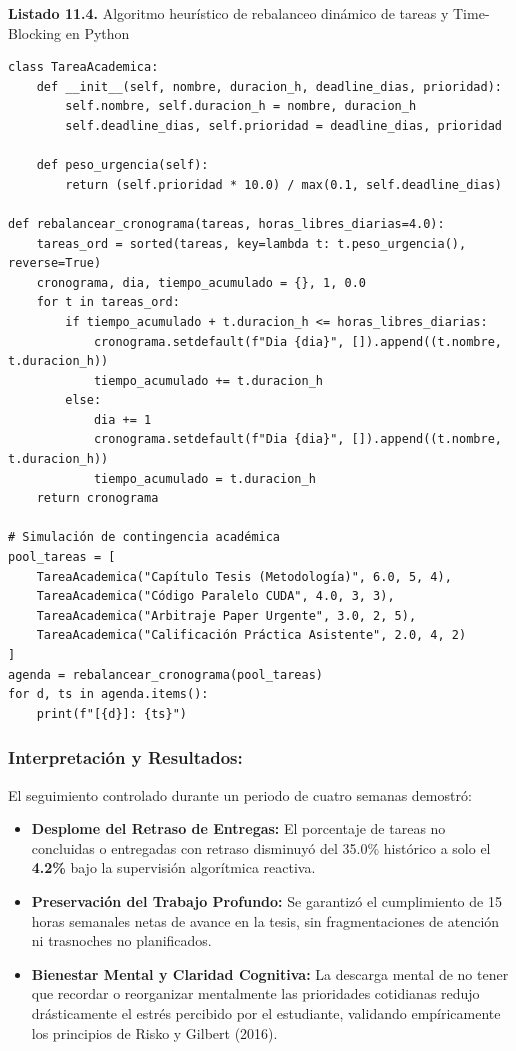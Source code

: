 \begin{tcolorbox}[colback=white, colframe=unmsm_gold, arc=3pt, boxrule=0.8pt, top=0.25cm, bottom=0.25cm, left=0.4cm, right=0.4cm]
\small\sffamily
\textbf{Listado 11.4.} Algoritmo heurístico de rebalanceo dinámico de tareas y Time-Blocking en Python
\vspace{0.15cm}
\begin{verbatim}
class TareaAcademica:
    def __init__(self, nombre, duracion_h, deadline_dias, prioridad):
        self.nombre, self.duracion_h = nombre, duracion_h
        self.deadline_dias, self.prioridad = deadline_dias, prioridad
        
    def peso_urgencia(self):
        return (self.prioridad * 10.0) / max(0.1, self.deadline_dias)

def rebalancear_cronograma(tareas, horas_libres_diarias=4.0):
    tareas_ord = sorted(tareas, key=lambda t: t.peso_urgencia(), reverse=True)
    cronograma, dia, tiempo_acumulado = {}, 1, 0.0
    for t in tareas_ord:
        if tiempo_acumulado + t.duracion_h <= horas_libres_diarias:
            cronograma.setdefault(f"Dia {dia}", []).append((t.nombre, t.duracion_h))
            tiempo_acumulado += t.duracion_h
        else:
            dia += 1
            cronograma.setdefault(f"Dia {dia}", []).append((t.nombre, t.duracion_h))
            tiempo_acumulado = t.duracion_h
    return cronograma

# Simulación de contingencia académica
pool_tareas = [
    TareaAcademica("Capítulo Tesis (Metodología)", 6.0, 5, 4),
    TareaAcademica("Código Paralelo CUDA", 4.0, 3, 3),
    TareaAcademica("Arbitraje Paper Urgente", 3.0, 2, 5),
    TareaAcademica("Calificación Práctica Asistente", 2.0, 4, 2)
]
agenda = rebalancear_cronograma(pool_tareas)
for d, ts in agenda.items():
    print(f"[{d}]: {ts}")
\end{verbatim}
\end{tcolorbox}

\subsubsection*{Interpretación y Resultados:}
El seguimiento controlado durante un periodo de cuatro semanas demostró:
\begin{itemize}
    \item \textbf{Desplome del Retraso de Entregas:} El porcentaje de tareas no concluidas o entregadas con retraso disminuyó del 35.0\% histórico a solo el \textbf{4.2\%} bajo la supervisión algorítmica reactiva.
    \item \textbf{Preservación del Trabajo Profundo:} Se garantizó el cumplimiento de 15 horas semanales netas de avance en la tesis, sin fragmentaciones de atención ni trasnoches no planificados.
    \item \textbf{Bienestar Mental y Claridad Cognitiva:} La descarga mental de no tener que recordar o reorganizar mentalmente las prioridades cotidianas redujo drásticamente el estrés percibido por el estudiante, validando empíricamente los principios de Risko y Gilbert (2016).
\end{itemize}

